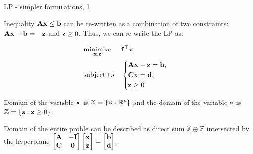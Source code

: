\documentclass{beamer}
\begin{document}
\begin{frame}{LP - simpler formulations, 1}
	\begin{flushleft}
		
		Inequality $\mathbf{A}\mathbf{x} \leq \mathbf{b}$ can be re-written as a combination of two constraints: $\mathbf{A}\mathbf{x} - \mathbf{b} = -\mathbf{z}$ and $\mathbf{z} \geq 0$. Thus, we can re-write the LP as:
		
		
		\begin{equation}
			\begin{aligned}
				& \underset{\mathbf{x}, \mathbf{z}}{\text{minimize}}
				& & \mathbf{f}^\top \mathbf{x} , \\
				& \text{subject to}
				& & \begin{cases} 
					\mathbf{A}\mathbf{x} - \mathbf{z} = \mathbf{b}, \\
					\mathbf{C}\mathbf{x} = \mathbf{d}, \\
					\mathbf{z} \geq 0
				\end{cases}
			\end{aligned}
		\end{equation}
		
		Domain of the variable $\mathbf{x}$ is $\mathbb{X} = \{ \mathbf{x}:  \mathbb{R}^n \}$ and the domain of the variable $\mathbf{z}$ is $\mathbb{Z} = \{ \mathbf{z}:  \mathbf{z} \geq 0 \}$.
		
		\bigskip 
		
		Domain of the entire proble can be described as direct sum $\mathbb{X}  \oplus \mathbb{Z}$ intersected by the hyperplane 
		$
		\begin{bmatrix}
			\mathbf{A} & - \mathbf{I} \\
			\mathbf{C} & \mathbf{0}
		\end{bmatrix}
		\begin{bmatrix}
			\mathbf{x} \\
			\mathbf{z} 
		\end{bmatrix}
		=
		\begin{bmatrix}
			\mathbf{b} \\
			\mathbf{d}
		\end{bmatrix}
		$.
		
	\end{flushleft}
\end{frame}
\end{document}
